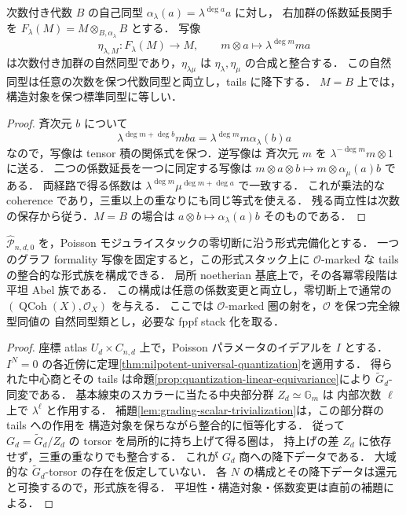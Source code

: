 \begin{lemma}[次数スカラーの整合的な恒等化]
\label{lem:grading-scalar-trivialization}
次数付き代数 $B$ の自己同型 $\alpha_\lambda(a)=\lambda^{\deg a}a$ に対し，
右加群の係数延長関手を
$F_\lambda(M)=M\otimes_{B,\alpha_\lambda}B$ とする．
写像
\[
 \eta_{\lambda,M}:F_\lambda(M)\longrightarrow M,
 \qquad m\otimes a\longmapsto\lambda^{\deg m}ma
\]
は次数付き加群の自然同型であり，$\eta_{\lambda\mu}$ は
$\eta_\lambda,\eta_\mu$ の合成と整合する．
この自然同型は任意の次数を保つ代数同型と両立し，tails に降下する．
$M=B$ 上では，構造対象を保つ標準同型に等しい．
\end{lemma}
\begin{proof}
斉次元 $b$ について
\[
 \lambda^{\deg m+\deg b}mba
 =\lambda^{\deg m}m\alpha_\lambda(b)a
\]
なので，写像は tensor 積の関係式を保つ．逆写像は
斉次元 $m$ を $\lambda^{-\deg m}m\otimes1$ に送る．
二つの係数延長を一つに同定する写像は
$m\otimes a\otimes b\mapsto m\otimes\alpha_\mu(a)b$ である．
両経路で得る係数は
$\lambda^{\deg m}\mu^{\deg m+\deg a}$ で一致する．
これが乗法的な coherence であり，三重以上の重なりにも同じ等式を使える．
残る両立性は次数の保存から従う．$M=B$ の場合は
$a\otimes b\mapsto\alpha_\lambda(a)b$ そのものである．
\end{proof}

\begin{theorem}
\label{thm:quantization-descent}
$\widehat{\mathcal P}_{n,d,0}$ を，Poisson モジュライスタックの零切断に沿う形式完備化とする．
一つのグラフ formality 写像を固定すると，この形式スタック上に
$\mathcal O$-marked な tails の整合的な形式族を構成できる．
局所 noetherian 基底上で，その各冪零段階は平坦 Abel 族である．
この構成は任意の係数変更と両立し，零切断上で通常の
$(\operatorname{QCoh}(X),\mathcal O_X)$ を与える．
ここでは $\mathcal O$-marked 圏の射を，$\mathcal O$ を保つ完全線型同値の
自然同型類とし，必要な fppf stack 化を取る．
\end{theorem}
\begin{proof}
座標 atlas $U_d\times C_{n,d}$ 上で，Poisson パラメータのイデアルを $I$ とする．
$I^N=0$ の各近傍に定理\ref{thm:nilpotent-universal-quantization}を適用する．
得られた中心商とその tails は命題\ref{prop:quantization-linear-equivariance}により
$\widetilde G_d$-同変である．
基本線束のスカラーに当たる中央部分群 $Z_d\simeq\mathbb G_m$ は
内部次数 $\ell$ 上で $\lambda^\ell$ と作用する．
補題\ref{lem:grading-scalar-trivialization}は，この部分群の tails への作用を
構造対象を保ちながら整合的に恒等化する．
従って $G_d=\widetilde G_d/Z_d$ の torsor を局所的に持ち上げて得る圏は，
持上げの差 $Z_d$ に依存せず，三重の重なりでも整合する．
これが $G_d$ 商への降下データである．
大域的な $\widetilde G_d$-torsor の存在を仮定していない．
各 $N$ の構成とその降下データは還元と可換するので，形式族を得る．
平坦性・構造対象・係数変更は直前の補題による．
\end{proof}

